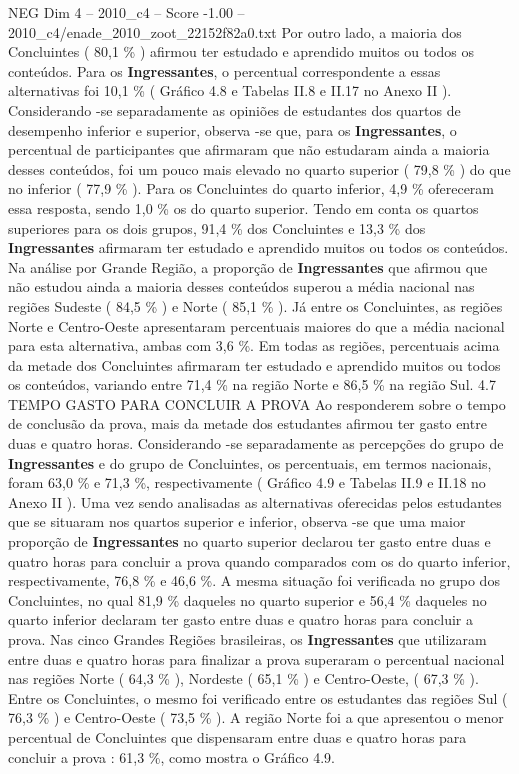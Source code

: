 \begin{textsample}{NEG Dim 4 – 2010\_c4 – Score -1.00 – 2010\_c4/enade\_2010\_zoot\_22152f82a0.txt}
Por outro lado, a maioria dos Concluintes ( 80,1 \% ) afirmou ter estudado e aprendido muitos ou todos os conteúdos.
Para os \textbf{Ingressantes}, o percentual correspondente a essas alternativas foi 10,1 \% ( Gráfico 4.8 e Tabelas II.8 e II.17 no Anexo II ).
Considerando -se separadamente as opiniões de estudantes dos quartos de desempenho inferior e superior, observa -se que, para os \textbf{Ingressantes}, o percentual de participantes que afirmaram que não estudaram ainda a maioria desses conteúdos, foi um pouco mais elevado no quarto superior ( 79,8 \% ) do que no inferior ( 77,9 \% ).
Para os Concluintes do quarto inferior, 4,9 \% ofereceram essa resposta, sendo 1,0 \% os do quarto superior.
Tendo em conta os quartos superiores para os dois grupos, 91,4 \% dos Concluintes e 13,3 \% dos \textbf{Ingressantes} afirmaram ter estudado e aprendido muitos ou todos os conteúdos.
Na análise por Grande Região, a proporção de \textbf{Ingressantes} que afirmou que não estudou ainda a maioria desses conteúdos superou a média nacional nas regiões Sudeste ( 84,5 \% ) e Norte ( 85,1 \% ).
Já entre os Concluintes, as regiões Norte e Centro-Oeste apresentaram percentuais maiores do que a média nacional para esta alternativa, ambas com 3,6 \%.
Em todas as regiões, percentuais acima da metade dos Concluintes afirmaram ter estudado e aprendido muitos ou todos os conteúdos, variando entre 71,4 \% na região Norte e 86,5 \% na região Sul. 4.7 TEMPO GASTO PARA CONCLUIR A PROVA Ao responderem sobre o tempo de conclusão da prova, mais da metade dos estudantes afirmou ter gasto entre duas e quatro horas.
Considerando -se separadamente as percepções do grupo de \textbf{Ingressantes} e do grupo de Concluintes, os percentuais, em termos nacionais, foram 63,0 \% e 71,3 \%, respectivamente ( Gráfico 4.9 e Tabelas II.9 e II.18 no Anexo II ).
Uma vez sendo analisadas as alternativas oferecidas pelos estudantes que se situaram nos quartos superior e inferior, observa -se que uma maior proporção de \textbf{Ingressantes} no quarto superior declarou ter gasto entre duas e quatro horas para concluir a prova quando comparados com os do quarto inferior, respectivamente, 76,8 \% e 46,6 \%.
A mesma situação foi verificada no grupo dos Concluintes, no qual 81,9 \% daqueles no quarto superior e 56,4 \% daqueles no quarto inferior declaram ter gasto entre duas e quatro horas para concluir a prova.
Nas cinco Grandes Regiões brasileiras, os \textbf{Ingressantes} que utilizaram entre duas e quatro horas para finalizar a prova superaram o percentual nacional nas regiões Norte ( 64,3 \% ), Nordeste ( 65,1 \% ) e Centro-Oeste, ( 67,3 \% ).
Entre os Concluintes, o mesmo foi verificado entre os estudantes das regiões Sul ( 76,3 \% ) e Centro-Oeste ( 73,5 \% ).
A região Norte foi a que apresentou o menor percentual de Concluintes que dispensaram entre duas e quatro horas para concluir a prova : 61,3 \%, como mostra o Gráfico 4.9.

\end{textsample}
